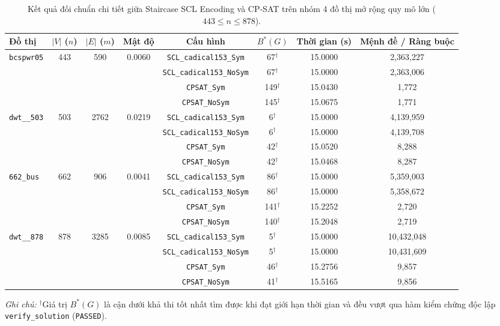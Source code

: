 \documentclass[a4paper,fleqn]{cas-sc}
\begin{document}
\begin{table}[pos=htbp]
\centering
\caption{Kết quả đối chuẩn chi tiết giữa Staircase SCL Encoding và CP-SAT trên nhóm 4 đồ thị mở rộng quy mô lớn ($443 \le n \le 878$).}
\label{tab:appendix_large_graphs}
\scriptsize
\begin{tabular}{lccccccc}
\toprule
\textbf{Đồ thị} & \textbf{$|V|$ ($n$)} & \textbf{$|E|$ ($m$)} & \textbf{Mật độ} & \textbf{Cấu hình} & \textbf{$B^*(G)$} & \textbf{Thời gian (s)} & \textbf{Mệnh đề / Ràng buộc} \\
\midrule
\texttt{bcspwr05} & 443 & 590 & 0.0060 & \texttt{SCL\_cadical153\_Sym} & 67$^\dagger$ & 15.0000 & 2,363,227 \\
 & & & & \texttt{SCL\_cadical153\_NoSym} & 67$^\dagger$ & 15.0000 & 2,363,006 \\
 & & & & \texttt{CPSAT\_Sym} & 149$^\dagger$ & 15.0430 & 1,772 \\
 & & & & \texttt{CPSAT\_NoSym} & 145$^\dagger$ & 15.0675 & 1,771 \\
\midrule
\texttt{dwt\_\_503} & 503 & 2762 & 0.0219 & \texttt{SCL\_cadical153\_Sym} & 6$^\dagger$ & 15.0000 & 4,139,959 \\
 & & & & \texttt{SCL\_cadical153\_NoSym} & 6$^\dagger$ & 15.0000 & 4,139,708 \\
 & & & & \texttt{CPSAT\_Sym} & 42$^\dagger$ & 15.0520 & 8,288 \\
 & & & & \texttt{CPSAT\_NoSym} & 42$^\dagger$ & 15.0468 & 8,287 \\
\midrule
\texttt{662\_bus} & 662 & 906 & 0.0041 & \texttt{SCL\_cadical153\_Sym} & 86$^\dagger$ & 15.0000 & 5,359,003 \\
 & & & & \texttt{SCL\_cadical153\_NoSym} & 86$^\dagger$ & 15.0000 & 5,358,672 \\
 & & & & \texttt{CPSAT\_Sym} & 141$^\dagger$ & 15.2252 & 2,720 \\
 & & & & \texttt{CPSAT\_NoSym} & 140$^\dagger$ & 15.2048 & 2,719 \\
\midrule
\texttt{dwt\_\_878} & 878 & 3285 & 0.0085 & \texttt{SCL\_cadical153\_Sym} & 5$^\dagger$ & 15.0000 & 10,432,048 \\
 & & & & \texttt{SCL\_cadical153\_NoSym} & 5$^\dagger$ & 15.0000 & 10,431,609 \\
 & & & & \texttt{CPSAT\_Sym} & 46$^\dagger$ & 15.2756 & 9,857 \\
 & & & & \texttt{CPSAT\_NoSym} & 41$^\dagger$ & 15.5165 & 9,856 \\
\bottomrule
\end{tabular}
\par\vspace{0.5ex}
\raggedright\textit{Ghi chú:} $^\dagger$Giá trị $B^*(G)$ là cận dưới khả thi tốt nhất tìm được khi đạt giới hạn thời gian và đều vượt qua hàm kiểm chứng độc lập \texttt{verify\_solution} (\texttt{PASSED}).
\end{table}
\end{document}
